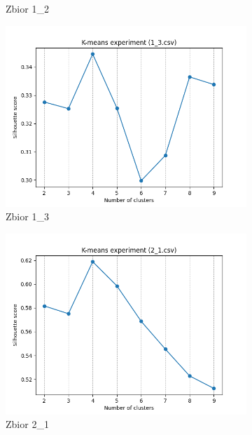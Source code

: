 \documentclass[12pt]{article}
\begin{document}
\begin{figure}[H]
\begin{subfigure}[b]{0.3\textwidth}
        \caption{Zbior 1\_2}
    \end{subfigure}
    \hfill
    \begin{subfigure}[b]{0.3\textwidth}
        \includegraphics[width=\linewidth]{img/exp_1/kmeans/1_3_scores.png}
        \caption{Zbior 1\_3}
    \end{subfigure}
    \begin{subfigure}[b]{0.3\textwidth}
        \includegraphics[width=\linewidth]{img/exp_1/kmeans/2_1_scores.png}
        \caption{Zbior 2\_1}
    \end{subfigure}
    \hfill
    \begin{subfigure}[b]{0.3\textwidth}

\end{subfigure}
\end{figure}
\end{document}

